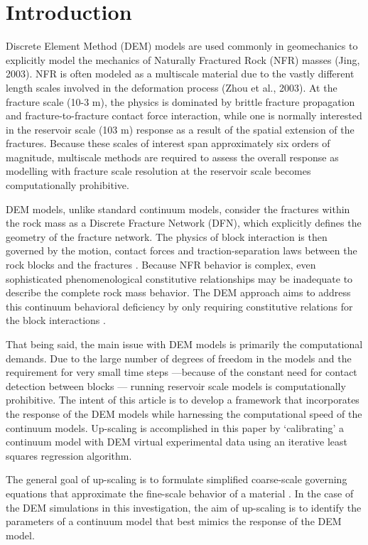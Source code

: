 \section{Introduction}
Discrete Element Method (DEM) models are used commonly in geomechanics to explicitly model the mechanics of Naturally Fractured Rock (NFR) masses (Jing, 2003). NFR is often modeled as a multiscale material due to the vastly different length scales involved in the deformation process (Zhou et al., 2003). At the fracture scale (10-3 m), the physics is dominated by brittle fracture propagation and fracture-to-fracture contact force interaction, while one is normally interested in the reservoir scale (103 m) response as a result of the spatial extension of the fractures. Because these scales of interest span approximately six orders of magnitude, multiscale methods are required to assess the overall response as modelling with fracture scale resolution at the reservoir scale becomes computationally prohibitive. 

DEM models, unlike standard continuum models, consider the fractures within the rock mass as a Discrete Fracture Network (DFN), which explicitly defines the geometry of the fracture network. The physics of block interaction is then governed by the motion, contact forces and traction-separation laws between the rock blocks and the fractures \cite{Cundall_1979}. Because NFR behavior is complex, even sophisticated phenomenological constitutive relationships may be inadequate to describe the complete rock mass behavior. The DEM approach aims to address this continuum behavioral deficiency by only requiring constitutive relations for the block interactions \cite{Cundall_2001}.

That being said, the main issue with DEM models is primarily the computational demands. Due to the large number of degrees of freedom in the models and the requirement for very small time steps —because of the constant need for contact detection between blocks — running reservoir scale models is computationally prohibitive. The intent of this article is to develop a framework that incorporates the response of the DEM models while harnessing the computational speed of the continuum models. Up-scaling is accomplished in this paper by ‘calibrating’ a continuum model with DEM virtual experimental data using an iterative least squares regression algorithm.

The general goal of up-scaling is to formulate simplified coarse-scale governing equations that approximate the fine-scale behavior of a material \cite{Geers_2010}. In the case of the DEM simulations in this investigation, the aim of up-scaling is to identify the parameters of a continuum model that best mimics the response of the DEM model.

